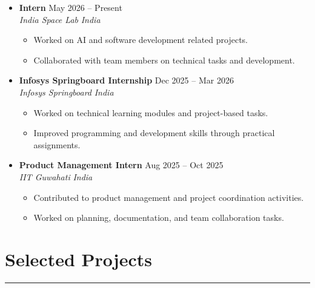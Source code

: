 \documentclass[letterpaper, 10pt]{article}
\begin{document}
\begin{itemize}

\item[]
\textbf{Intern} \hfill May 2026 -- Present \\

\textit{India Space Lab} \hfill \textit{India}

\begin{itemize}
\item Worked on AI and software development related projects.
\item Collaborated with team members on technical tasks and development.
\end{itemize}

\item[]
\textbf{Infosys Springboard Internship} \hfill Dec 2025 -- Mar 2026 \\

\textit{Infosys Springboard} \hfill \textit{India}

\begin{itemize}
\item Worked on technical learning modules and project-based tasks.
\item Improved programming and development skills through practical assignments.
\end{itemize}

\item[]
\textbf{Product Management Intern} \hfill Aug 2025 -- Oct 2025 \\

\textit{IIT Guwahati} \hfill \textit{India}

\begin{itemize}
\item Contributed to product management and project coordination activities.
\item Worked on planning, documentation, and team collaboration tasks.
\end{itemize}

\end{itemize}

\section*{Selected Projects}
\hrule
\vspace{4pt}
\end{document}
